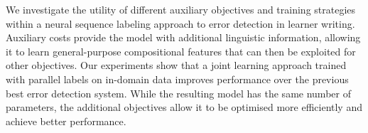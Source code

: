 We investigate the utility of different auxiliary objectives and training strategies within a neural sequence labeling approach to error detection in learner writing. Auxiliary costs provide the model with additional linguistic information, allowing it to learn general-purpose compositional features that can then be exploited for other objectives. Our experiments show that a joint learning approach trained with parallel labels on in-domain data improves performance over the previous best error detection system. While the resulting model has the same number of parameters, the additional objectives allow it to be optimised more efficiently and achieve better performance.
